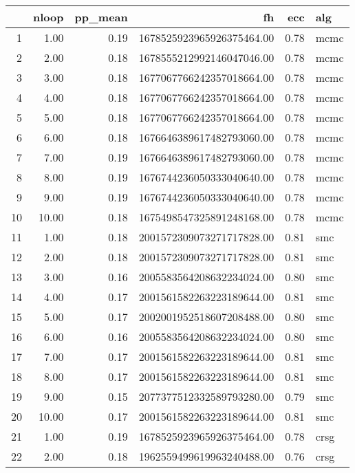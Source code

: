 % 
\begin{table}[ht]
    \centering
    \begin{tabular}{rrrrrl}
      \hline
     & nloop & pp\_mean & fh & ecc & alg \\ 
      \hline
    1 & 1.00 & 0.19 & 1678525923965926375464.00 & 0.78 & mcmc \\ 
      2 & 2.00 & 0.18 & 1678555212992146047046.00 & 0.78 & mcmc \\ 
      3 & 3.00 & 0.18 & 1677067766242357018664.00 & 0.78 & mcmc \\ 
      4 & 4.00 & 0.18 & 1677067766242357018664.00 & 0.78 & mcmc \\ 
      5 & 5.00 & 0.18 & 1677067766242357018664.00 & 0.78 & mcmc \\ 
      6 & 6.00 & 0.18 & 1676646389617482793060.00 & 0.78 & mcmc \\ 
      7 & 7.00 & 0.19 & 1676646389617482793060.00 & 0.78 & mcmc \\ 
      8 & 8.00 & 0.19 & 1676744236050333040640.00 & 0.78 & mcmc \\ 
      9 & 9.00 & 0.19 & 1676744236050333040640.00 & 0.78 & mcmc \\ 
      10 & 10.00 & 0.18 & 1675498547325891248168.00 & 0.78 & mcmc \\ 
      11 & 1.00 & 0.18 & 2001572309073271717828.00 & 0.81 & smc \\ 
      12 & 2.00 & 0.18 & 2001572309073271717828.00 & 0.81 & smc \\ 
      13 & 3.00 & 0.16 & 2005583564208632234024.00 & 0.80 & smc \\ 
      14 & 4.00 & 0.17 & 2001561582263223189644.00 & 0.81 & smc \\ 
      15 & 5.00 & 0.17 & 2002001952518607208488.00 & 0.80 & smc \\ 
      16 & 6.00 & 0.16 & 2005583564208632234024.00 & 0.80 & smc \\ 
      17 & 7.00 & 0.17 & 2001561582263223189644.00 & 0.81 & smc \\ 
      18 & 8.00 & 0.17 & 2001561582263223189644.00 & 0.81 & smc \\ 
      19 & 9.00 & 0.15 & 2077377512332589793280.00 & 0.79 & smc \\ 
      20 & 10.00 & 0.17 & 2001561582263223189644.00 & 0.81 & smc \\ 
      21 & 1.00 & 0.19 & 1678525923965926375464.00 & 0.78 & crsg \\ 
      22 & 2.00 & 0.18 & 1962559499619963240488.00 & 0.76 & crsg \\ 

\end{tabular}
\end{table}
